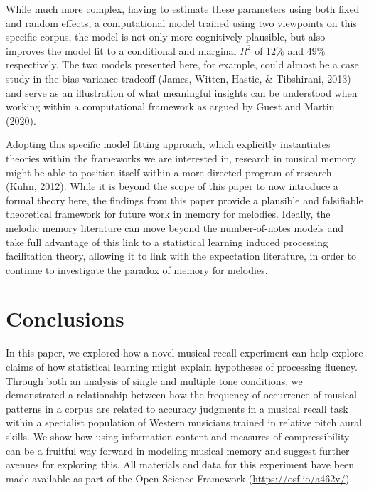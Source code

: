 \documentclass[english,man,floatsintext]{apa6}
\begin{document}
While much more complex, having to estimate these parameters using both fixed and random effects, a computational model trained using two viewpoints on this specific corpus, the model is not only more cognitively plausible, but also improves the model fit to a conditional and marginal \(R^2\) of 12\% and 49\% respectively.
The two models presented here, for example, could almost be a case study in the bias variance tradeoff (James, Witten, Hastie, \& Tibshirani, 2013) and serve as an illustration of what meaningful insights can be understood when working within a computational framework as argued by Guest and Martin (2020).

Adopting this specific model fitting approach, which explicitly instantiates theories within the frameworks we are interested in, research in musical memory might be able to position itself within a more directed program of research (Kuhn, 2012).
While it is beyond the scope of this paper to now introduce a formal theory here, the findings from this paper provide a plausible and falsifiable theoretical framework for future work in memory for melodies.
Ideally, the melodic memory literature can move beyond the number-of-notes models and take full advantage of this link to a statistical learning induced processing facilitation theory, allowing it to link with the expectation literature, in order to continue to investigate the paradox of memory for melodies.

\hypertarget{conclusions}{%
\section{Conclusions}\label{conclusions}}

In this paper, we explored how a novel musical recall experiment can help explore claims of how statistical learning might explain hypotheses of processing fluency.
Through both an analysis of single and multiple tone conditions, we demonstrated a relationship between how the frequency of occurrence of musical patterns in a corpus are related to accuracy judgments in a musical recall task within a specialist population of Western musicians trained in relative pitch aural skills.
We show how using information content and measures of compressibility can be a fruitful way forward in modeling musical memory and suggest further avenues for exploring this.
All materials and data for this experiment have been made available as part of the Open Science Framework (\url{https://osf.io/a462v/}).

\newpage
\end{document}
